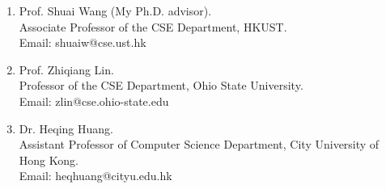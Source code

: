 \begin{enumerate}
\item Prof. Shuai Wang (My Ph.D. advisor).\\
Associate Professor of the CSE Department, HKUST.\\
Email: shuaiw@cse.ust.hk
\item Prof. Zhiqiang Lin.\\
Professor of the CSE Department, Ohio State University.\\
Email: zlin@cse.ohio-state.edu
\item Dr. Heqing Huang.\\
Assistant Professor of Computer Science Department, City University of Hong Kong.\\
Email: heqhuang@cityu.edu.hk
\end{enumerate}